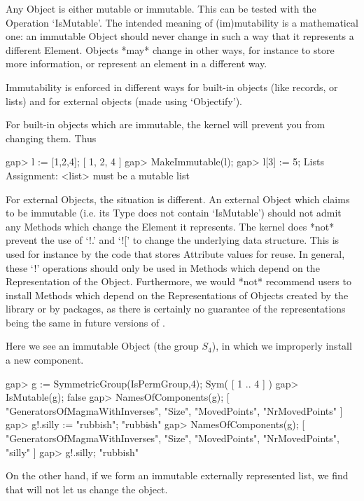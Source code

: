 
Any {\GAP} Object is either mutable or immutable. This can be tested
with the Operation `IsMutable'. The intended meaning of (im)mutability
is a mathematical one:  an immutable Object should never change in
such a way that it represents a different Element. Objects *may*
change in other ways, for instance to store more information, or
represent an element in a different way.

Immutability is enforced in different ways for built-in objects (like
records, or lists) and for external objects (made using `Objectify').

For built-in objects which are immutable, the kernel will prevent
you from changing them. Thus

\beginexample
gap> l := [1,2,4];
[ 1, 2, 4 ]
gap> MakeImmutable(l);
gap> l[3] := 5;
Lists Assignment: <list> must be a mutable list
\endexample

For external Objects, the situation is different. An external Object which
claims to be immutable (i.e. its Type does not contain `IsMutable')
should not admit any Methods which change the Element it represents.
The kernel does *not* prevent the use of `!.' and `![' to change the
underlying data structure.
This is used for instance by the code that stores Attribute values for reuse.
In general, these `!' operations should only be used in Methods
which depend on the Representation of the Object. Furthermore, we would *not*
recommend users to install Methods which depend on the Representations of
Objects created by the library or by {\GAP} packages, as there is certainly no
guarantee of the representations being the same in future versions of {\GAP}.

Here we see an immutable Object (the group $S_4$), in which we improperly
install a new component.

\beginexample
gap> g := SymmetricGroup(IsPermGroup,4);
Sym( [ 1 .. 4 ] )
gap> IsMutable(g);
false
gap> NamesOfComponents(g);
[ "GeneratorsOfMagmaWithInverses", "Size", "MovedPoints", "NrMovedPoints" ]
gap> g!.silly := "rubbish";
"rubbish"
gap> NamesOfComponents(g);
[ "GeneratorsOfMagmaWithInverses", "Size", "MovedPoints", "NrMovedPoints", 
  "silly" ]
gap> g!.silly;
"rubbish"
\endexample

On the other hand, if we form an immutable externally represented list, we
find that {\GAP} will not let us change the object.

